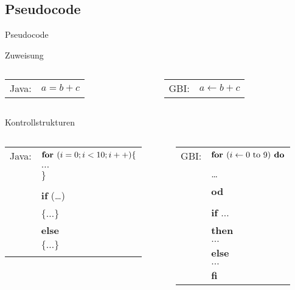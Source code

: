 \subsection{Pseudocode}
\begin{frame}{Pseudocode}
\begin{block}{Zuweisung}
	\begin{columns}
		\begin{column}{0.45\textwidth}
   			\begin{tabular}{ll}
   				Java: & $a = b + c$
   			\end{tabular}
		\end{column}
		\begin{column}{0.45\textwidth}
    		\begin{tabular}{ll}
   				GBI: & $a \leftarrow b + c$
   			\end{tabular}
		\end{column}
	\end{columns}
\end{block}

\begin{block}{Kontrollstrukturen}
	\small
	\begin{columns}
		\begin{column}{0.45\textwidth}
   			\begin{tabular}[t]{ll}
   				Java: & $\text{\textbf{for }} (i=0;i<10;i++) \{ $\\
   				& $\dots$ \\
   				& $\}$\\
   				& \\
   				& \textbf{if} (\dots) \\
   				& \\
   				& $\{\dots\}$ \\
   				& \textbf{else} \\
   				& $\{\dots\}$ \\
   				& \\
   			\end{tabular}
		\end{column}
		\begin{column}{0.45\textwidth}
    		\begin{tabular}[t]{ll}
   				GBI: & $\text{\textbf{for }} (i \leftarrow 0 \text{ to } 9) \text{\textbf{ do}}$ \\
   				& \dots \\
   				& \textbf{od}\\
   				& \\
   				& \textbf{if} $\dots$ \\
   				& \textbf{then} \\
   				& $\dots$ \\
   				& \textbf{else}\\
   				& $\dots$\\
   				& \textbf{fi}




\end{tabular}
\end{column}
\end{columns}
\end{block}
\end{frame}
